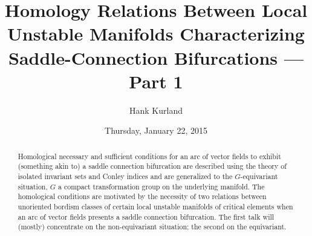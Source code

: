 \documentclass{UAmathtalk}
\author{Hank Kurland}
\title{Homology Relations Between Local Unstable Manifolds Characterizing Saddle-Connection Bifurcations --- Part 1}
\date{Thursday, January 22, 2015}
\begin{document}
\maketitle

\begin{abstract}
Homological necessary and sufficient conditions for an arc of vector fields to exhibit (something akin to) a saddle connection bifurcation are described using the theory of isolated invariant sets and Conley indices and are generalized to the $G$-equivariant situation, $G$ a compact transformation group on the underlying manifold.
The homological conditions are motivated by the necessity of two relations between unoriented bordism classes of certain local unstable manifolds of critical elements when an arc of vector fields presents a saddle connection bifurcation.
The first talk will (mostly) concentrate on the non-equivariant situation; the second on the equivariant.
\end{abstract}
\end{document}
